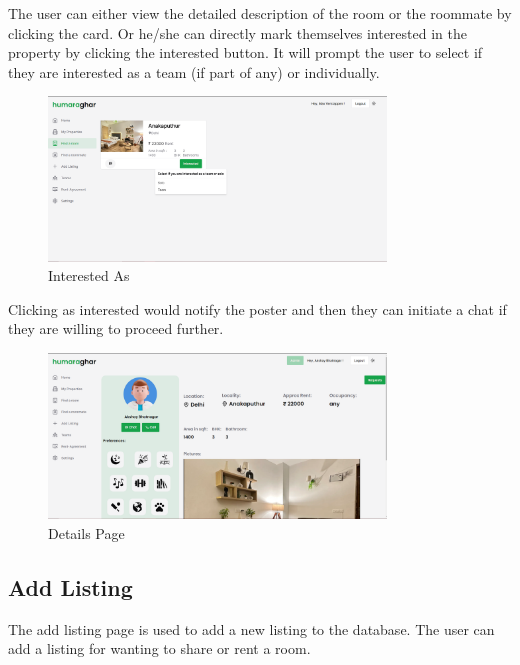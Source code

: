 \clearpage

The user can either view the detailed description of the room or the roommate by clicking the card. Or he/she can
directly mark themselves interested in the property by clicking the interested button. It will prompt the user to select
if they are interested as a team (if part of any) or individually.

\begin{figure}[h]
    \centering
    \includegraphics[width=0.8\textwidth]{Images/screenshots/interestedas.PNG}
    \caption{Interested As}
\end{figure}

Clicking as interested would notify the poster and then they can initiate a chat if they are willing to proceed further.
\begin{figure}[h]
    \centering
    \includegraphics[width=0.8\textwidth]{Images/screenshots/userpage.PNG}
    \caption{Details Page}
\end{figure}
\clearpage

\subsection{Add Listing}
The add listing page is used to add a new listing to the database. The user can add a listing for wanting to share or rent a room.

